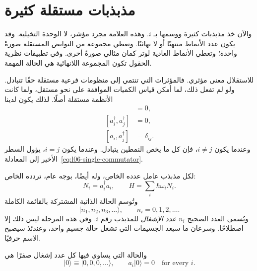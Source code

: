 \section{مذبذبات مستقلة كثيرة}

والآن خذ مذبذبات كثيرة ووسمها بـ \(i\). وهذه العلامة مجرد مؤشر، لا الوحدة التخيلية. وقد يكون عدد الأنماط منتهيًا أو لا نهائيًا. وتعطي مجموعة من النوابض المستقلة صورةً واحدة؛ وتعطي الأنماط العادية لوتر كمان مثالي صورةً أخرى. وفي تطبيقات نظرية الحقول تكون المجموعة اللانهائية هي الحالة المهمة.

للاستقلال معنى مؤثري. فالمؤثرات التي تنتمي إلى منظومات فرعية مستقلة حقًا تتبادل. ولو لم تفعل ذلك، لما أمكن قياس الكميات الموافقة على نحو مستقل، ولما كانت الأنظمة مستقلة أصلًا. لذلك يكون لدينا
\begin{align}
[a_i,a_j]&=0, \\
[a_i^\dagger,a_j^\dagger]&=0, \\
[a_i,a_j^\dagger]&=\delta_{ij}.
\label{eq:l06-many-commutators}
\end{align}
وعندما يكون \(i\ne j\)، فإن كل ما يخص النمطين يتبادل. وعندما يكون \(i=j\)، يؤول السطر الأخير إلى المعادلة~\eqref{eq:l06-single-commutator}.

لكل مذبذب عامل عدده الخاص، وله أيضًا، بوجه عام، تردده الخاص:
\begin{equation}
N_i=a_i^\dagger a_i,
\qquad
H=\sum_i\hbar\omega_i N_i.
\label{eq:l06-many-hamiltonian}
\end{equation}
وتُوسم الحالة الذاتية المشتركة بالقائمة الكاملة
\begin{equation}
|n_1,n_2,n_3,\ldots\rangle,
\qquad n_i=0,1,2,\ldots.
\label{eq:l06-occupation-ket}
\end{equation}
ويُسمى العدد الصحيح \(n_i\) \emph{عدد الإشغال} للمذبذب رقم \(i\). وفي هذه المرحلة ليس ذلك إلا اصطلاحًا. وسرعان ما سيعد الجسيمات التي تشغل حالة جسيم واحد، وعندئذ سيصبح الاسم حرفيًا.

والحالة التي يساوي فيها كل عدد إشغال صفرًا هي
\begin{equation}
|0\rangle\equiv|0,0,0,\ldots\rangle,
\qquad a_i|0\rangle=0\quad\text{for every }i.
\label{eq:l06-oscillator-vacuum}
\end{equation}

\begin{classroomqa}
\end{classroomqa}


